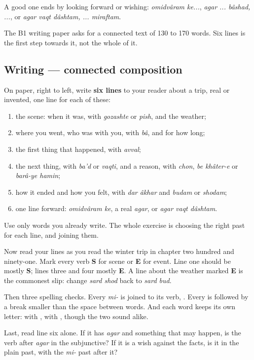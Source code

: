 A good one ends by looking forward or wishing: \emph{omidvâram ke...}, \emph{agar ... bâshad, ...}, or \emph{agar vaqt dâshtam, ... miraftam}.

The B1 writing paper asks for a connected text of 130 to 170 words. Six lines is the first step towards it, not the whole of it.

\subsection*{Writing — connected composition}
On paper, right to left, write \textbf{six lines} to your reader about a trip, real or invented, one line for each of these:

\begin{enumerate}
\raggedright
  \item the scene: when it was, with \emph{gozashte} or \emph{pish}, and the weather;
  \item where you went, who was with you, with \emph{bâ}, and for how long;
  \item the first thing that happened, with \emph{avval};
  \item the next thing, with \emph{ba'd} or \emph{vaqti}, and a reason, with \emph{chon}, \emph{be khâter-e} or \emph{barâ-ye hamin};
  \item how it ended and how you felt, with \emph{dar âkhar} and \emph{budam} or \emph{shodam};
  \item one line forward: \emph{omidvâram ke}, a real \emph{agar}, or \emph{agar vaqt dâshtam}.
\end{enumerate}

Use only words you already write. The whole exercise is choosing the right past for each line, and joining them.

\begin{tcolorbox}[breakable,colback=teal!4,colframe=teal!35!black,title={Before you move on}]
Now read your lines as you read the winter trip in chapter two hundred and ninety-one. Mark every verb \textbf{S} for scene or \textbf{E} for event. Line one should be mostly \textbf{S}; lines three and four mostly \textbf{E}. A line about the weather marked \textbf{E} is the commonest slip: change \emph{sard shod} back to \emph{sard bud}.

Then three spelling checks. Every \emph{mi-} is joined to its verb, \textbf{}. Every \textbf{} is followed by a break smaller than the space between words. And each word keeps its own letter: \textbf{} with \textbf{}, \textbf{} with \textbf{}, though the two sound alike.

Last, read line six alone. If it has \emph{agar} and something that may happen, is the verb after \emph{agar} in the subjunctive? If it is a wish against the facts, is it in the plain past, with the \emph{mi-} past after it?
\end{tcolorbox}

